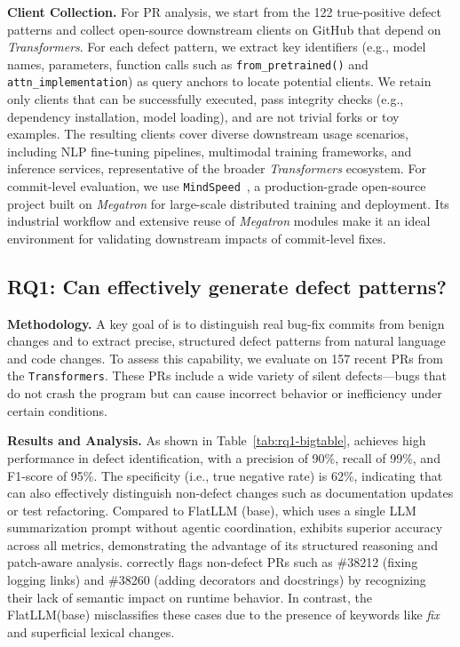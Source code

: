 \noindent \textbf{Client Collection.}
\label{sec:clientcollection}
For PR analysis, we start from the 122 true-positive defect patterns and collect open-source downstream clients on GitHub that depend on \textit{Transformers}.
For each defect pattern, we extract key identifiers (e.g., model names, parameters, function calls such as \texttt{from\_pretrained()} and \texttt{attn\_implementation}) as query anchors to locate potential clients.
We retain only clients that can be successfully executed, pass integrity checks (e.g., dependency installation, model loading), and are not trivial forks or toy examples.
The resulting clients cover diverse downstream usage scenarios, including NLP fine-tuning pipelines, multimodal training frameworks, and inference services, representative of the broader \textit{Transformers} ecosystem.
For commit-level evaluation, we use \texttt{MindSpeed}~\cite{mindspeed}, a production-grade open-source project built on \textit{Megatron} for large-scale distributed training and deployment.
Its industrial workflow and extensive reuse of \textit{Megatron} modules make it an ideal environment for validating downstream impacts of commit-level fixes.


\subsection{RQ1: Can \appname effectively generate defect patterns?}
\noindent\textbf{Methodology.}
A key goal of \appname is to distinguish real bug-fix commits from benign changes and to extract precise, structured defect patterns from natural language and code changes.
To assess this capability, we evaluate \appname on 157 recent PRs from the \texttt{Transformers}. 
These PRs include a wide variety of silent defects—bugs that do not crash the program but can cause incorrect behavior or inefficiency under certain conditions.

\noindent\textbf{Results and Analysis.}  
As shown in Table~\ref{tab:rq1-bigtable}, \appname achieves high performance in defect identification, with a precision of 90\%, recall of 99\%, and F1-score of 95\%.
The specificity (i.e., true negative rate) is 62\%, indicating that \appname can also effectively distinguish non-defect changes such as documentation updates or test refactoring.
Compared to FlatLLM (base), which uses a single LLM summarization prompt without agentic coordination, \appname exhibits superior accuracy across all metrics, demonstrating the advantage of its structured reasoning and patch-aware analysis.
\appname correctly flags non-defect PRs such as \#38212 (fixing logging links) and \#38260 (adding decorators and docstrings) by recognizing their lack of semantic impact on runtime behavior. 
In contrast, the FlatLLM(base) misclassifies these cases due to the presence of keywords like \textit{fix} and superficial lexical changes.

